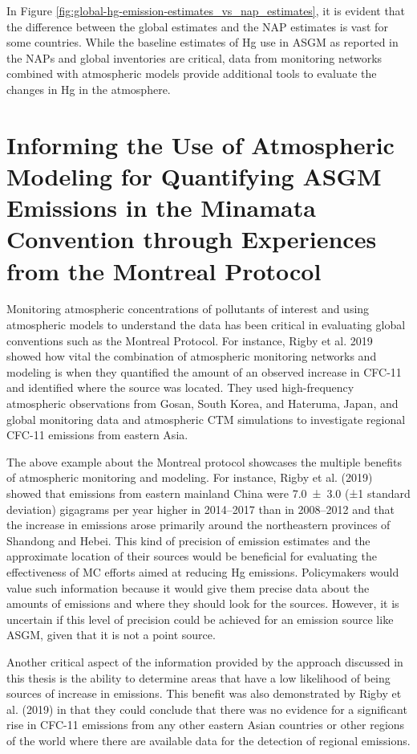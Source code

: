  In Figure \ref{fig:global-hg-emission-estimates_vs_nap_estimates}, it is evident that the difference between the global estimates and the NAP estimates is vast for some countries. While the baseline estimates of Hg use in ASGM as reported in the NAPs and global inventories are critical, data from monitoring networks combined with atmospheric models provide additional tools to evaluate the changes in Hg in the atmosphere. 

\section{Informing the Use of Atmospheric Modeling for Quantifying ASGM Emissions in the Minamata Convention through Experiences from the Montreal Protocol} \label{motreal_protocol_comparison}
Monitoring atmospheric concentrations of pollutants of interest and using atmospheric models to understand the data has been critical in evaluating global conventions such as the Montreal Protocol. For instance, Rigby et al. 2019 showed how vital the combination of atmospheric monitoring networks and modeling is when they quantified the amount of an observed increase in CFC-11 and identified where the source was located\cite{rigby_increase_2019}. They used high-frequency atmospheric observations from Gosan, South Korea, and Hateruma, Japan, and global monitoring data and atmospheric CTM simulations to investigate regional CFC-11 emissions from eastern Asia.  
\begin{flushleft}
    The above example about the Montreal protocol showcases the multiple benefits of atmospheric monitoring and modeling. For instance, Rigby et al. (2019)  showed that emissions from eastern mainland China were 7.0 ± 3.0 (±1 standard deviation) gigagrams per year higher in 2014–2017 than in 2008–2012 and that the increase in emissions arose primarily around the northeastern provinces of Shandong and Hebei\cite{rigby_increase_2019}. This kind of precision of emission estimates and the approximate location of their sources would be beneficial for evaluating the effectiveness of MC efforts aimed at reducing Hg emissions. Policymakers would value such information because it would give them precise data about the amounts of emissions and where they should look for the sources. However, it is uncertain if this level of precision could be achieved for an emission source like ASGM, given that it is not a point source.
    
    Another critical aspect of the information provided by the approach discussed in this thesis is the ability to determine areas that have a low likelihood of being sources of increase in emissions. This benefit was also demonstrated  by Rigby et al. (2019)  in that they could conclude that there was no evidence for a significant rise in CFC-11 emissions from any other eastern Asian countries or other regions of the world where there are available data for the detection of regional emissions.
\end{flushleft}

